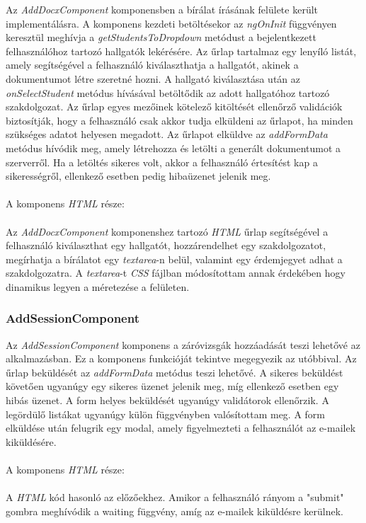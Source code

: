 Az \textit{AddDocxComponent} komponensben a bírálat írásának felülete került implementálásra. A komponens kezdeti betöltésekor az \textit{ngOnInit} függvényen keresztül meghívja a \textit{getStudentsToDropdown} metódust a bejelentkezett felhasználóhoz tartozó hallgatók lekérésére. Az űrlap tartalmaz egy lenyíló listát, amely segítségével a felhasználó kiválaszthatja a hallgatót, akinek a dokumentumot létre szeretné hozni. A hallgató kiválasztása után az \textit{onSelectStudent} metódus hívásával betöltődik az adott hallgatóhoz tartozó szakdolgozat. Az űrlap egyes mezőinek kötelező kitöltését ellenőrző validációk biztosítják, hogy a felhasználó csak akkor tudja elküldeni az űrlapot, ha minden szükséges adatot helyesen megadott. Az űrlapot elküldve az \textit{addFormData} metódus hívódik meg, amely létrehozza és letölti a generált dokumentumot a szerverről. Ha a letöltés sikeres volt, akkor a felhasználó értesítést kap a sikerességről, ellenkező esetben pedig hibaüzenet jelenik meg.\\
\\
A komponens \textit{HTML} része:\\
\\
Az \textit{AddDocxComponent} komponenshez tartozó \textit{HTML} űrlap segítségével a felhasználó kiválaszthat egy hallgatót, hozzárendelhet egy szakdolgozatot, megírhatja a bírálatot egy \textit{textarea}-n belül, valamint  egy érdemjegyet adhat a szakdolgozatra. A \textit{textarea}-t \textit{CSS} fájlban módosítottam annak érdekében hogy dinamikus legyen a méretezése a felületen.

\subsubsection{AddSessionComponent}

Az \textit{AddSessionComponent} komponens a záróvizsgák hozzáadását teszi lehetővé az alkalmazásban. Ez a komponens funkcióját tekintve megegyezik az utóbbival. Az űrlap beküldését az \textit{addFormData} metódus teszi lehetővé. A sikeres beküldést követően ugyanúgy egy sikeres üzenet jelenik meg, míg ellenkező esetben egy hibás üzenet. A form helyes beküldését ugyanúgy validátorok ellenőrzik. A legördülő listákat ugyanúgy külön függvényben valósítottam meg. A form elküldése után felugrik egy modal, amely figyelmezteti a felhasználót az e-mailek kiküldésére.\\
\\
A komponens \textit{HTML} része:\\
\\
A \textit{HTML} kód hasonló az előzőekhez. Amikor a felhasználó rányom a "submit" gombra meghívódik a waiting függvény, amíg az e-mailek kiküldésre kerülnek.


